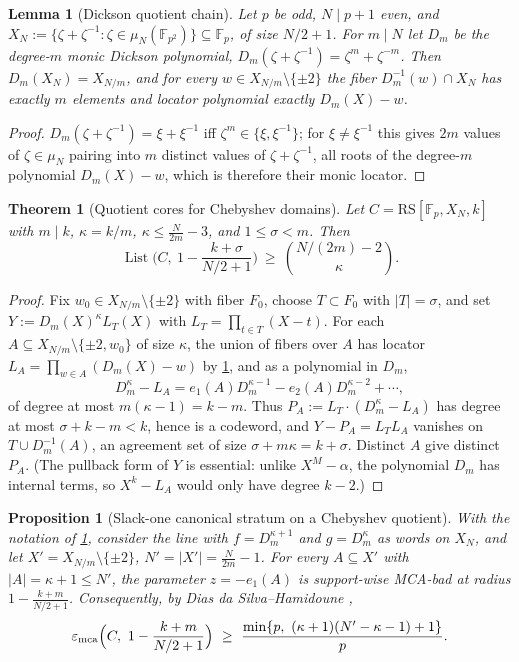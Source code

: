 \documentclass[11pt]{article}
\newtheorem{theorem}{Theorem}[section]
\newtheorem{lemma}[lemma]{Lemma}
\newtheorem{proposition}[proposition]{Proposition}
\theoremstyle{definition}
\newcommand{\F}{\mathbb F}
\newcommand{\eps}{\varepsilon}
\newcommand{\RS}{\mathrm{RS}}
\newcommand{\emca}{\eps_{\rm mca}}
\newcommand{\Lst}{\operatorname{List}}
\begin{document}
\begin{lemma}[Dickson quotient chain]\label{lem:chebchain}
Let $p$ be odd, $N\mid p+1$ even, and $X_N:=\{\zeta+\zeta^{-1}:\zeta\in\mu_N(\F_{p^2})\}\subseteq\F_p$, of size $N/2+1$.  For $m\mid N$ let $D_m$ be the degree-$m$ monic Dickson polynomial, $D_m(\zeta+\zeta^{-1})=\zeta^m+\zeta^{-m}$.  Then $D_m(X_N)=X_{N/m}$, and for every $w\in X_{N/m}\setminus\{\pm2\}$ the fiber $D_m^{-1}(w)\cap X_N$ has exactly $m$ elements and locator polynomial exactly $D_m(X)-w$.
\end{lemma}

\begin{proof}
$D_m(\zeta+\zeta^{-1})=\xi+\xi^{-1}$ iff $\zeta^m\in\{\xi,\xi^{-1}\}$; for $\xi\ne\xi^{-1}$ this gives $2m$ values of $\zeta\in\mu_N$ pairing into $m$ distinct values of $\zeta+\zeta^{-1}$, all roots of the degree-$m$ polynomial $D_m(X)-w$, which is therefore their monic locator.
\end{proof}

\begin{theorem}[Quotient cores for Chebyshev domains]\label{thm:chebqcore}
Let $C=\RS[\F_p,X_N,k]$ with $m\mid k$, $\kappa=k/m$, $\kappa\le\frac N{2m}-3$, and $1\le\sigma<m$.  Then
\[
        \Lst\Big(C,\ 1-\frac{k+\sigma}{N/2+1}\Big)\ \ge\ \binom{N/(2m)-2}{\kappa}.
\]
\end{theorem}

\begin{proof}
Fix $w_0\in X_{N/m}\setminus\{\pm2\}$ with fiber $F_0$, choose $T\subset F_0$ with $|T|=\sigma$, and set $Y:=D_m(X)^{\kappa}L_T(X)$ with $L_T=\prod_{t\in T}(X-t)$.  For each $A\subseteq X_{N/m}\setminus\{\pm2,w_0\}$ of size $\kappa$, the union of fibers over $A$ has locator $L_A=\prod_{w\in A}(D_m(X)-w)$ by \cref{lem:chebchain}, and as a polynomial in $D_m$,
\[
        D_m^{\kappa}-L_A=e_1(A)D_m^{\kappa-1}-e_2(A)D_m^{\kappa-2}+\cdots,
\]
of degree at most $m(\kappa-1)=k-m$.  Thus $P_A:=L_T\cdot(D_m^\kappa-L_A)$ has degree at most $\sigma+k-m<k$, hence is a codeword, and $Y-P_A=L_TL_A$ vanishes on $T\cup D_m^{-1}(A)$, an agreement set of size $\sigma+m\kappa=k+\sigma$.  Distinct $A$ give distinct $P_A$.  (The pullback form of $Y$ is essential: unlike $X^M-\alpha$, the polynomial $D_m$ has internal terms, so $X^k-L_A$ would only have degree $k-2$.)
\end{proof}

\begin{proposition}[Slack-one canonical stratum on a Chebyshev quotient]\label{prop:chebslack}
With the notation of \cref{thm:chebqcore}, consider the line with $f=D_m^{\kappa+1}$ and $g=D_m^{\kappa}$ as words on $X_N$, and let $X'=X_{N/m}\setminus\{\pm2\}$, $N'=|X'|=\frac N{2m}-1$.  For every $A\subseteq X'$ with $|A|=\kappa+1\le N'$, the parameter $z=-e_1(A)$ is support-wise MCA-bad at radius $1-\frac{k+m}{N/2+1}$.  Consequently, by Dias da Silva--Hamidoune \cite{DH94},
\[
        \emca\Big(C,\ 1-\frac{k+m}{N/2+1}\Big)\ \ge\ \frac{\min\{p,\ (\kappa+1)(N'-\kappa-1)+1\}}{p}.
\]
\end{proposition}
\end{document}
